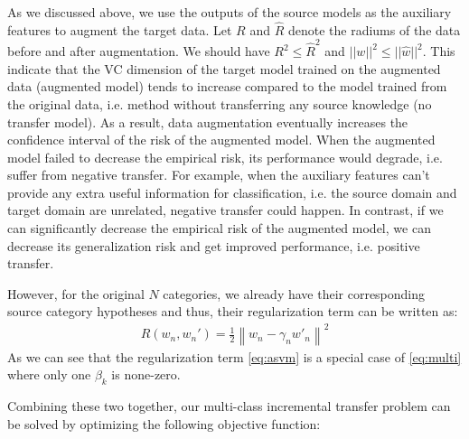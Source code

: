 As we discussed above, we use the outputs of the source models as the auxiliary features to augment the target data. Let $R$ and $\hat{R}$ denote the radiums of the data before and after augmentation. We should have $R^2 \le \hat{R}^2$ and $||w||^2\le ||\hat{w}||^2$. This indicate that the VC dimension of the target model trained on the augmented data (augmented model) tends to increase compared to the model trained from the original data, i.e. method without transferring any source knowledge (no transfer model). As a result, data augmentation eventually increases the confidence interval of the risk of the augmented model. When the augmented model failed to decrease the empirical risk, its performance would degrade, i.e. suffer from negative transfer. For example, when the auxiliary features can't provide any extra useful information for classification, i.e. the source domain and target domain are unrelated, negative transfer could happen. In contrast, if we can significantly decrease the empirical risk of the augmented model, we can decrease its generalization risk and get improved performance, i.e. positive transfer.


However, for the original $N$ categories, we already have their corresponding source category hypotheses and thus, their regularization term can be written as:
\begin{equation}\label{eq:asvm}
\begin{aligned}
R(w_n,w_n')= \frac{1}{2}{{{\left\| {{w_n} - {\gamma _n}{{w'}_n}} \right\|}^2}}  
\end{aligned}
\end{equation}
As we can see that the regularization term \eqref{eq:asvm} is a special case of \eqref{eq:multi} where only one $\beta_k$ is none-zero. 

Combining these two together, our multi-class incremental transfer problem can be solved by optimizing the following objective function:

